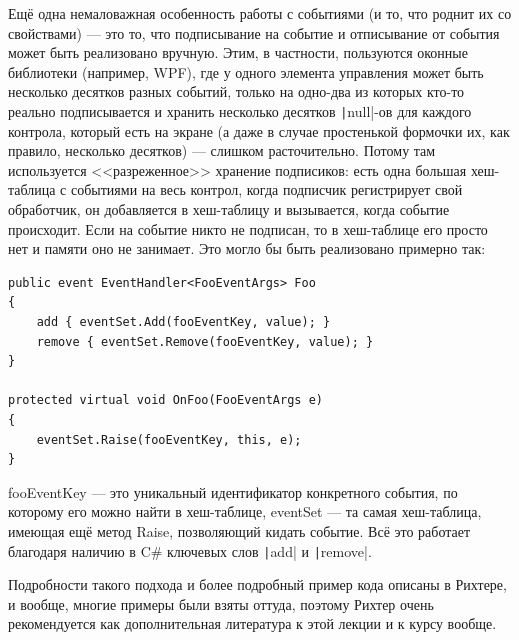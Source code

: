 \documentclass[a5paper]{article}
\begin{document}
Ещё одна немаловажная особенность работы с событиями (и то, что роднит их со свойствами) --- это то, что подписывание на событие и отписывание от события может быть реализовано вручную. Этим, в частности, пользуются оконные библиотеки (например, WPF), где у одного элемента управления может быть несколько десятков разных событий, только на одно-два из которых кто-то реально подписывается и хранить несколько десятков \texttt|null|-ов для каждого контрола, который есть на экране (а даже в случае простенькой формочки их, как правило, несколько десятков) --- слишком расточительно. Потому там используется <<разреженное>> хранение подписиков: есть одна большая хеш-таблица с событиями на весь контрол, когда подписчик регистрирует свой обработчик, он добавляется в хеш-таблицу и вызывается, когда событие происходит. Если на событие никто не подписан, то в хеш-таблице его просто нет и памяти оно не занимает. Это могло бы быть реализовано примерно так:

\begin{verbatim}
public event EventHandler<FooEventArgs> Foo 
{
    add { eventSet.Add(fooEventKey, value); }
    remove { eventSet.Remove(fooEventKey, value); }
}

protected virtual void OnFoo(FooEventArgs e) 
{
    eventSet.Raise(fooEventKey, this, e);
}
\end{verbatim}

fooEventKey --- это уникальный идентификатор конкретного события, по которому его можно найти в хеш-таблице, eventSet --- та самая хеш-таблица, имеющая ещё метод Raise, позволяющий кидать событие. Всё это работает благодаря наличию в C\# ключевых слов \texttt|add| и \texttt|remove|.

Подробности такого подхода и более подробный пример кода описаны в Рихтере, и вообще, многие примеры были взяты оттуда, поэтому Рихтер очень рекомендуется как дополнительная литература к этой лекции и к курсу вообще.
\end{document}

